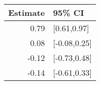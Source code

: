 \begin{tabular}{rl}
  \hline
Estimate & 95\% CI \\ 
  \hline
0.79 & [0.61,0.97] \\ 
  0.08 & [-0.08,0.25] \\ 
  -0.12 & [-0.73,0.48] \\ 
  -0.14 & [-0.61,0.33] \\ 
   \hline
\end{tabular}


